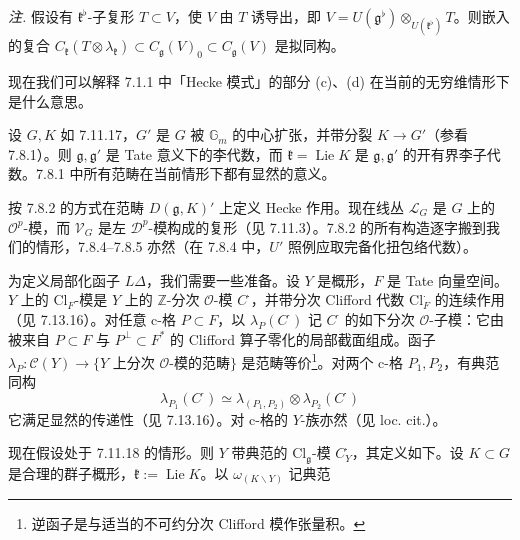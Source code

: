  \emph{注.} 假设有 $\mathfrak{k}^{\flat}$-子复形 $T\subset V$，使 $V$ 由 $T$ 诱导出，即 $V=U(\mathfrak{g}^{\flat})\otimes_{U(\mathfrak{k}^{\flat})}T$。则嵌入的复合 $C_{\mathfrak{k}}(T\otimes\lambda_{\mathfrak{k}})\subset C_{\mathfrak{g}}(V)_{0}\subset C_{\mathfrak{g}}(V)$ 是拟同构。


 现在我们可以解释 7.1.1 中「Hecke 模式」的部分 (c)、(d) 在当前的无穷维情形下是什么意思。

 设 $G,K$ 如 7.11.17，$G'$ 是 $G$ 被 $\mathbb{G}_{m}$ 的中心扩张，并带分裂 $K\to G'$（参看 7.8.1）。则 $\mathfrak{g},\mathfrak{g}'$ 是 Tate 意义下的李代数，而 $\mathfrak{k}=\operatorname{Lie}K$ 是 $\mathfrak{g},\mathfrak{g}'$ 的开有界李子代数。7.8.1 中所有范畴在当前情形下都有显然的意义。

按 7.8.2 的方式在范畴 $D(\mathfrak{g},K)'$ 上定义 Hecke 作用。现在线丛 $\mathcal{L}_{G}$ 是 $G$ 上的 $\mathcal{O}^{p}$-模，而 $\mathcal{V}_{G}$ 是左 $\mathcal{D}^{p}$-模构成的复形（见 7.11.3）。7.8.2 的所有构造逐字搬到我们的情形，7.8.4--7.8.5 亦然（在 7.8.4 中，$U'$ 照例应取完备化扭包络代数）。

 为定义局部化函子 $L\Delta$，我们需要一些准备。设 $Y$ 是概形，$F$ 是 Tate 向量空间。$Y$ 上的 $\mathrm{Cl}_{F}$-模是 $Y$ 上的 $\mathbb{Z}$-分次 $\mathcal{O}$-模 $C^{\cdot}$，并带分次 Clifford 代数 $\mathrm{Cl}^{\cdot}_{F}$ 的连续作用（见 7.13.16）。对任意 c-格 $P\subset F$，以 $\lambda_{P}(C^{\cdot})$ 记 $C^{\cdot}$ 的如下分次 $\mathcal{O}$-子模：它由被来自 $P\subset F$ 与 $P^{\perp}\subset F^{*}$ 的 Clifford 算子零化的局部截面组成。函子 $\lambda_{P}:\mathcal{C}(Y)\to\{Y$ 上分次 $\mathcal{O}$-模的范畴$\}$ 是范畴等价\footnote{逆函子是与适当的不可约分次 Clifford 模作张量积。}。对两个 c-格 $P_{1},P_{2}$，有典范同构
\begin{equation}\tag{377}
\lambda_{P_{1}}(C^{\cdot})\simeq\lambda_{(P_{1},P_{2})}\otimes\lambda_{P_{2}}(C^{\cdot})
\end{equation}
它满足显然的传递性（见 7.13.16）。对 c-格的 $Y$-族亦然（见 loc. cit.）。

 现在假设处于 7.11.18 的情形。则 $Y$ 带典范的 $\mathrm{Cl}_{\mathfrak{g}}$-模 $C^{\cdot}_{Y}$，其定义如下。设 $K\subset G$ 是合理的群子概形，$\mathfrak{k}:=\operatorname{Lie}K$。以 $\omega_{(K\backslash Y)}$ 记典范

